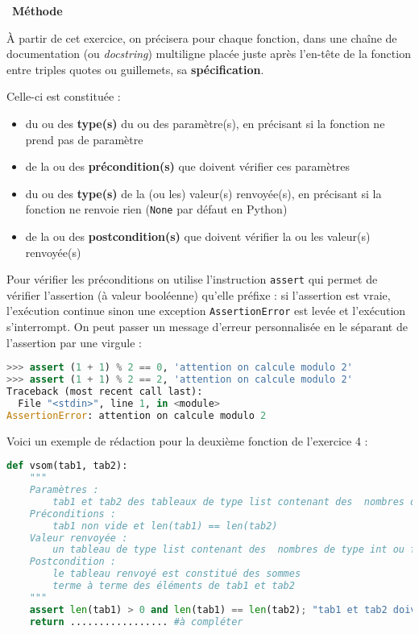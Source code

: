 \documentclass[
  11pt,
]{article}
\newcommand{\passthrough}[1]{#1}
\providecommand{\tightlist}{%
  \setlength{\itemsep}{0pt}\setlength{\parskip}{0pt}}
\newcounter{def}
\newenvironment{methode}[1]
{\par \medskip    \noindent  
 \begin {bclogo}[arrondi =0.1,logo=\bcoutil, marge=4,noborder = true] {~\textbf{Méthode}   {\itshape #1} }  \par}
{
\end{bclogo}
 \par \bigskip }
\begin{document}
\begin{methode}{}

À partir de cet exercice, on précisera pour chaque fonction, dans une
chaîne de documentation (ou \emph{docstring}) multiligne placée juste
après l'en-tête de la fonction entre triples quotes ou guillemets, sa
\textbf{spécification}.

Celle-ci est constituée :

\begin{itemize}
\tightlist
\item
  du ou des \textbf{type(s)} du ou des paramètre(s), en précisant si la
  fonction ne prend pas de paramètre
\item
  de la ou des \textbf{précondition(s)} que doivent vérifier ces
  paramètres
\item
  du ou des \textbf{type(s)} de la (ou les) valeur(s) renvoyée(s), en
  précisant si la fonction ne renvoie rien
  (\passthrough{\lstinline!None!} par défaut en Python)
\item
  de la ou des \textbf{postcondition(s)} que doivent vérifier la ou les
  valeur(s) renvoyée(s)
\end{itemize}

Pour vérifier les préconditions on utilise l'instruction
\passthrough{\lstinline!assert!} qui permet de vérifier l'assertion (à
valeur booléenne) qu'elle préfixe : si l'assertion est vraie,
l'exécution continue sinon une exception
\passthrough{\lstinline!AssertionError!} est levée et l'exécution
s'interrompt. On peut passer un message d'erreur personnalisée en le
séparant de l'assertion par une virgule :

\begin{lstlisting}[language=Python]
>>> assert (1 + 1) % 2 == 0, 'attention on calcule modulo 2'
>>> assert (1 + 1) % 2 == 2, 'attention on calcule modulo 2'
Traceback (most recent call last):
  File "<stdin>", line 1, in <module>
AssertionError: attention on calcule modulo 2
\end{lstlisting}

Voici un exemple de rédaction pour la deuxième fonction de l'exercice 4
:

\begin{lstlisting}[language=Python]
def vsom(tab1, tab2):
    """
    Paramètres :
        tab1 et tab2 des tableaux de type list contenant des  nombres de type int ou float
    Préconditions :
        tab1 non vide et len(tab1) == len(tab2)
    Valeur renvoyée :
        un tableau de type list contenant des  nombres de type int ou float
    Postcondition :
        le tableau renvoyé est constitué des sommes
        terme à terme des éléments de tab1 et tab2        
    """
    assert len(tab1) > 0 and len(tab1) == len(tab2); "tab1 et tab2 doivent être de même longueur"
    return ................. #à compléter
\end{lstlisting}

\end{methode}
\end{document}
